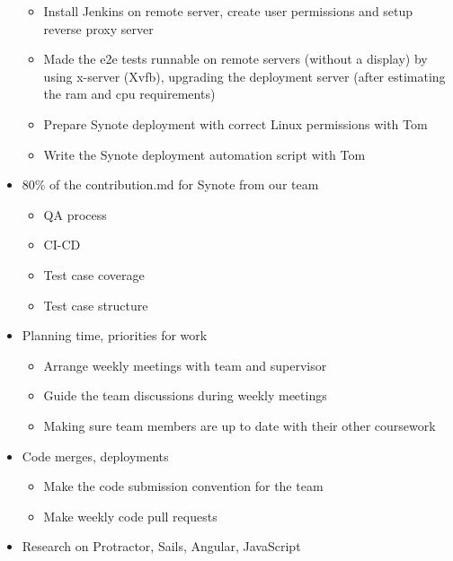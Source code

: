 \begin{itemize}
 \begin{itemize}
  \item Install Jenkins on remote server, create user permissions and setup reverse proxy server
  \item Made the e2e tests runnable on remote servers (without a display) by using x-server (Xvfb), upgrading the deployment server (after estimating the ram and cpu requirements)
  \item Prepare Synote deployment with correct Linux permissions with Tom
  \item Write the Synote deployment automation script with Tom
 \end{itemize}
 \item 80\% of the contribution.md for Synote from our team
 \begin{itemize}
  \item QA process
  \item CI-CD
  \item Test case coverage
  \item Test case structure
 \end{itemize}
 \item Planning time, priorities for work
 \begin{itemize}
  \item Arrange weekly meetings with team and supervisor
  \item Guide the team discussions during weekly meetings
  \item Making sure team members are up to date with their other coursework
 \end{itemize}
 \item Code merges, deployments
 \begin{itemize}
  \item Make the code submission convention for the team
  \item Make weekly code pull requests
 \end{itemize}
 \item Research on Protractor, Sails, Angular, JavaScript
\end{itemize}
